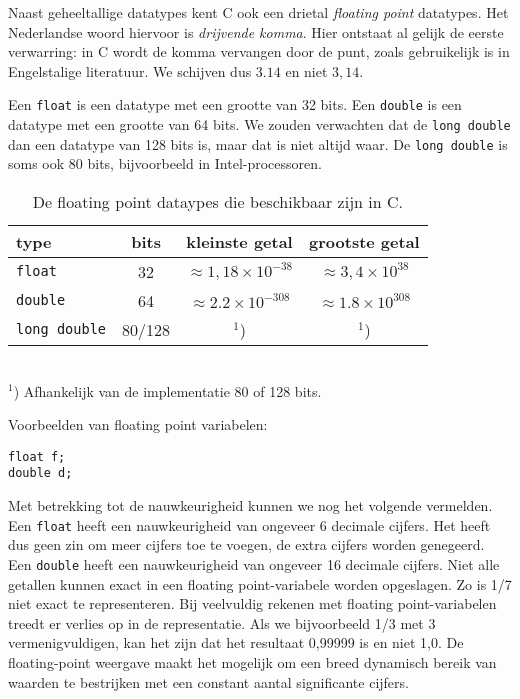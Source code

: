 Naast geheeltallige datatypes kent C ook een drietal \textsl{floating point} datatypes. Het Nederlandse woord hiervoor is \textsl{drijvende komma}. Hier ontstaat al gelijk de eerste verwarring: in C wordt de komma vervangen door de punt, zoals gebruikelijk is in Engelstalige literatuur. We schijven dus $3.14$ en niet $3,14$.

Een \texttt{float} is een datatype met een grootte van 32 bits. Een \texttt{double} is een datatype met een grootte van 64 bits. We zouden verwachten dat de \texttt{long double} dan een datatype van 128 bits is, maar dat is niet altijd waar. De \texttt{long double} is soms ook 80 bits, bijvoorbeeld in Intel-processoren.

\begin{table}[!ht]
\centering
\caption{De floating point dataypes die beschikbaar zijn in C.}
\label{tab:varfloatdatatypes}
\begin{tabular}{@{}lccc@{}}
\toprule
\textbf{type}          & \textbf{bits} & \textbf{kleinste getal} &  \textbf{grootste getal} \\ \midrule
\texttt{float}         & 32                      & $\approx1,18\times10^{-38}$ & $\approx3,4\times10^{38}$  \\
\texttt{double   }     & 64                      & $\approx2.2\times10^{-308}$ & $\approx1.8\times10^{308}$ \\
\texttt{long double}   & 80/128                      & $^1$) & $^1$)  \\
\bottomrule
\end{tabular}\\\vspace*{1mm}
\footnotesize$^1$) Afhankelijk van de implementatie 80 of 128 bits.
\end{table}

Voorbeelden van floating point variabelen:

\hspace*{1em}\texttt{float f;}\\
\hspace*{1em}\texttt{double d;}

Met betrekking tot de nauwkeurigheid kunnen we nog het volgende vermelden. Een \texttt{float} heeft een nauwkeurigheid van ongeveer 6 decimale cijfers. Het heeft dus geen zin om meer cijfers toe te voegen, de extra cijfers worden genegeerd. Een \texttt{double} heeft een nauwkeurigheid van ongeveer 16 decimale cijfers. Niet alle getallen kunnen exact in een floating point-variabele worden opgeslagen. Zo is 1/7 niet exact te representeren. Bij veelvuldig rekenen met floating point-variabelen treedt er verlies op in de representatie. Als we bijvoorbeeld 1/3 met 3 vermenigvuldigen, kan het zijn dat het resultaat 0,99999 is en niet 1,0. De floating-point weergave maakt het mogelijk om een breed dynamisch bereik van waarden te bestrijken met een constant aantal significante cijfers.

